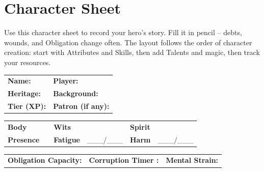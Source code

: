 \chapter{Character Sheet}
\label{ch:charsheet}

Use this character sheet to record your hero's story. Fill it in pencil -- debts, wounds, and Obligation change often. The layout follows the order of character creation: start with Attributes and Skills, then add Talents and magic, then track your resources.

\clearpage
\thispagestyle{empty}


\begin{tcolorbox}[
    enhanced, sharp corners, 
    colback=white, colframe=black!50, 
    title={\large\bfseries Character Identity}, 
    fonttitle=\bfseries, 
    attach boxed title to top center={yshift=-3mm},
    breakable
]
\begin{tabular}{p{}p{}}
\textbf{Name:} \hrulefill & \textbf{Player:} \hrulefill \\
\textbf{Heritage:} \hrulefill & \textbf{Background:} \hrulefill \\
\textbf{Tier (XP):} \hrulefill & \textbf{Patron (if any):} \hrulefill \\
\end{tabular}
\end{tcolorbox}

\begin{tcolorbox}[
    enhanced, sharp corners, 
    colback=white, colframe=black!50, 
    title={\large\bfseries Attributes \& Derived}, 
    fonttitle=\bfseries,
    breakable
]
\renewcommand{\arraystretch}{1.5}
\begin{tabular}{p{2.5cm}p{1.5cm}p{2.5cm}p{1.5cm}p{2.5cm}p{1.5cm}}
\textbf{Body} & \hrulefill & \textbf{Wits} & \hrulefill & \textbf{Spirit} & \hrulefill \\
\textbf{Presence} & \hrulefill & \textbf{Fatigue} & \_\_\_/\_\_\_ & \textbf{Harm} & \_\_\_/\_\_\_ \\
\end{tabular}
\vspace{4pt}
\begin{tabular}{p{}p{}p{}}
\textbf{Obligation Capacity:} \hrulefill & \textbf{Corruption Timer :} \hrulefill & \textbf{Mental Strain:} \hrulefill \\
\end{tabular}
\end{tcolorbox}

